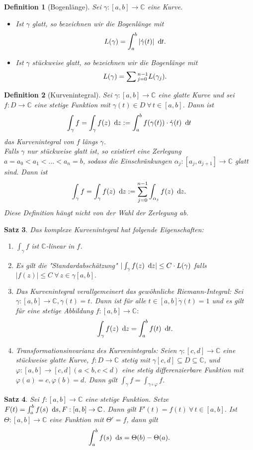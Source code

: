 \documentclass[a4paper,12pt]{book}
\theoremstyle{newthm}
\newtheorem{thm}{Satz}[section]
\theoremstyle{newdef}
\newtheorem{defn}[thm]{Definition}
\theoremstyle{newrem}
\newcommand{\C}{\mathbb{C}}
\renewcommand{\d}{\ \operatorname{d}\hspace{-2px}}
\begin{document}
		\begin{defn}[Bogenlänge]
			Sei $ \gamma: [a,b] \to \C $ eine Kurve.
			\begin{itemize}
				\item Ist $\gamma$ glatt, so bezeichnen wir die Bogenlänge mit 
				$$ L(\gamma) = \int_{a}^{b} |\dot{\gamma}(t)| \d t. $$
				\item Ist $\gamma$ stückweise glatt, so bezeichnen wir die Bogenlänge mit 
				$$ L(\gamma) = \sum\\
				_{j=0}^{n-1} L(\gamma_j). $$
			\end{itemize}
		\end{defn}
		
		\begin{defn}[Kurvenintegral]
			Sei $ \gamma: [a,b] \to \C $ eine glatte Kurve und sei $ f: D \to \C $ eine stetige Funktion mit $ \gamma(t) \in D \ \forall\, t \in [a,b] $. Dann ist 
			\[ \int_\gamma f = \int_\gamma f(z) \d z := \int_{a}^{b} f(\gamma(t)) \cdot \dot{\gamma}(t) \d t \]	
			das \emph{Kurvenintegral} von $f$ längs $\gamma$.\\
			Falls $\gamma$ nur stückweise glatt ist, so existiert eine Zerlegung $ a=a_0 < a_1 < \dots < a_n=b $, sodass die Einschränkungen $ \alpha_j : [a_j,a_{j+1}] \to \C $ glatt sind. Dann ist 
			\[ \int_\gamma f = \int_\gamma f(z) \d z := \sum_{j=0}^{n-1} \int_{\alpha_j} f(z) \d z. \]
			Diese Definition hängt nicht von der Wahl der Zerlegung ab.
		\end{defn}
		
		\begin{thm}
			Das komplexe Kurvenintegral hat folgende Eigenschaften:
			\begin{enumerate}
				\item $ \int_\gamma f $ ist $\C$-linear in $f$.
				\item Es gilt die "Standardabschätzung" $ |\int_\gamma f(z) \d z| \leq C \cdot L(\gamma) $ falls $ |f(z)| \leq C \ \forall\, z \in \gamma[a,b]. $
				\item Das Kurvenintegral verallgemeinert das gewöhnliche Riemann-Integral: Sei $ \gamma: [a,b] \to \C, \gamma(t) = t $. Dann ist für alle $ t \in [a,b] \dot{\gamma}(t) = 1 $ und es gilt für eine stetige Abbildung $ f: [a,b] \to \C:$
				$$ \int_\gamma f(z) \d z = \int_{a}^b f(t) \d t. $$
				\item Transformationsinvarianz des Kurvenintegrals: Seien $ \gamma: [c,d] \to \C $ eine stückweise glatte Kurve, $ f: D \to \C $ stetig mit $ \gamma[c,d] \subseteq D \subseteq \C $, und $ \varphi: [a,b] \to [c,d] (a<b,c<d) $ eine stetig differenzierbare Funktion mit $ \varphi(a) = c, \varphi(b) = d $. Dann gilt $ \int_\gamma f = \int_{\gamma \circ \varphi} f $.
			\end{enumerate}
		\end{thm}
		\begin{thm}
			Sei $ f:[a,b] \to \C $ eine stetige Funktion. Setze $ F(t) = \int_{a}^b f(s) \d s, F: [a,b] \to \C $. Dann gilt $ F'(t) = f(t) \ \forall\, t \in [a,b]. $ Ist $ \Theta: [a,b] \to \C $ eine Funktion mit $ \Theta' = f $, dann gilt 
			$$ \int_a^b f(s) \d s = \Theta(b) - \Theta(a). $$
		\end{thm}
		
\end{document}

